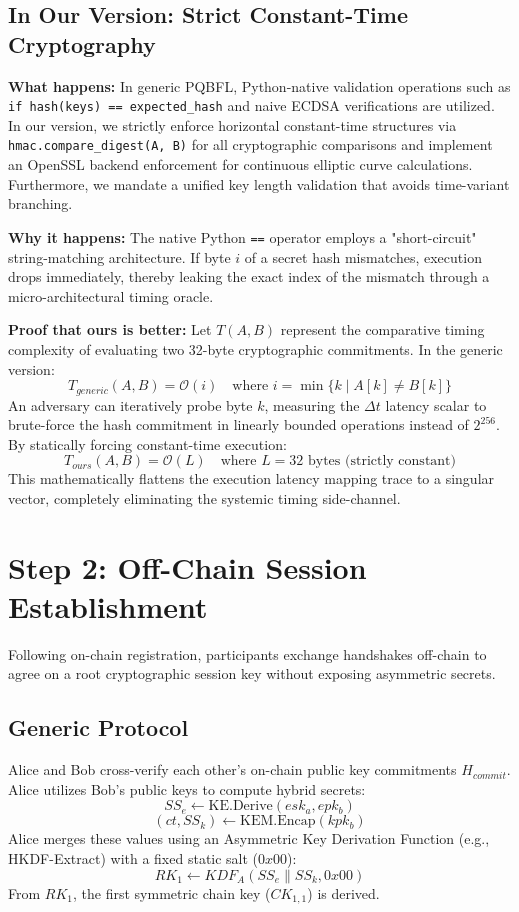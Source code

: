 \documentclass[12pt]{article}
\begin{document}
\subsection*{In Our Version: Strict Constant-Time Cryptography}
\textbf{What happens:} In generic PQBFL, Python-native validation operations such as \verb|if hash(keys) == expected_hash| and naive ECDSA verifications are utilized. In our version, we strictly enforce horizontal constant-time structures via \verb|hmac.compare_digest(A, B)| for all cryptographic comparisons and implement an OpenSSL backend enforcement for continuous elliptic curve calculations. Furthermore, we mandate a unified key length validation that avoids time-variant branching.

\textbf{Why it happens:} The native Python \verb|==| operator employs a "short-circuit" string-matching architecture. If byte $i$ of a secret hash mismatches, execution drops immediately, thereby leaking the exact index of the mismatch through a micro-architectural timing oracle. 

\textbf{Proof that ours is better:} 
Let $T(A, B)$ represent the comparative timing complexity of evaluating two 32-byte cryptographic commitments. In the generic version:
\[
T_{generic}(A, B) = \mathcal{O}(i) \quad \text{where } i = \min\{k \mid A[k] \ne B[k]\}
\]
An adversary can iteratively probe byte $k$, measuring the $\Delta t$ latency scalar to brute-force the hash commitment in linearly bounded operations instead of $2^{256}$.
By statically forcing constant-time execution:
\[
T_{ours}(A, B) = \mathcal{O}(L) \quad \text{where } L = 32 \text{ bytes (strictly constant)}
\]
This mathematically flattens the execution latency mapping trace to a singular vector, completely eliminating the systemic timing side-channel. 

\section*{Step 2: Off-Chain Session Establishment}

Following on-chain registration, participants exchange handshakes off-chain to agree on a root cryptographic session key without exposing asymmetric secrets.

\subsection*{Generic Protocol}
Alice and Bob cross-verify each other's on-chain public key commitments $H_{commit}$. Alice utilizes Bob's public keys to compute hybrid secrets:
\[
SS_e \leftarrow \text{KE.Derive}(esk_a, epk_b)
\]
\[
(ct, SS_k) \leftarrow \text{KEM.Encap}(kpk_b)
\]
Alice merges these values using an Asymmetric Key Derivation Function (e.g., HKDF-Extract) with a fixed static salt ($0x00$):
\[
RK_1 \leftarrow KDF_A(SS_e \parallel SS_k, 0x00)
\]
From $RK_1$, the first symmetric chain key ($CK_{1,1}$) is derived.
\end{document}

